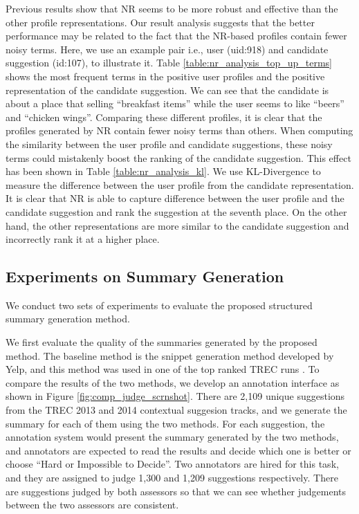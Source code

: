 Previous results show that NR seems to be more robust and effective
than the other profile representations. Our result analysis suggests
that the better performance may be related to the fact that the 
NR-based profiles contain fewer noisy terms. Here, we use an example pair
i.e., user (uid:918) and candidate suggestion (id:107), to 
illustrate it. 
Table \ref{table:nr_analysis_top_up_terms} shows the most frequent
terms in the positive user profiles and the positive representation of
the candidate suggestion.
We can see that the candidate is about a place that selling
``breakfast items'' while the user seems to like ``beers'' and
``chicken wings''. Comparing these different profiles, it is
clear that the profiles generated by NR contain fewer noisy terms
than others.  When computing the similarity between the user
profile and candidate suggestions, these noisy terms could
mistakenly boost the ranking of the candidate suggestion.
This effect has been shown in Table \ref{table:nr_analysis_kl}.
We use KL-Divergence to measure the difference between
the user profile from the candidate representation.
It is clear that NR is able to capture difference between
the user profile and the candidate suggestion and rank
the suggestion at the seventh place.  On the other hand,
the other representations are more similar to the candidate
suggestion and incorrectly rank it at a higher place.

%


\subsection{Experiments on Summary Generation}
\label{sec:results_summary}

We conduct two sets of experiments to evaluate the proposed structured
summary generation method. 

We first evaluate the quality of the summaries generated by the 
proposed method.  The baseline method is the snippet generation 
method developed by Yelp, and this method was used in one of the 
top ranked TREC runs \cite{adriel:overview2014}.  
To compare the results of the two methods, we develop an annotation 
interface as shown in Figure \ref{fig:comp_judge_scrnshot}. 
There are 2,109 unique suggestions from the TREC 2013 and 2014 
contextual suggesion tracks, and we generate the summary for 
each of them using the two methods.  For each suggestion, the annotation 
system would present the summary generated by the two methods, and 
annotators are expected to read the results and decide which one is 
better or choose ``Hard or Impossible to Decide''. Two annotators are hired 
for this task, and they are assigned to judge 1,300 and 1,209 
suggestions respectively. There are suggestions judged by both assessors 
so that we can see whether judgements between the two assessors 
are consistent. 

